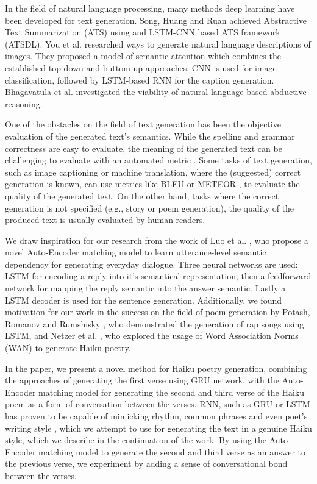 \documentclass{acm_proc_article-sp}
\begin{document}
In the field of natural language processing, many methods deep learning have been developed for text generation. Song, Huang and Ruan \cite{song2019abstractive} achieved Abstractive Text Summarization (ATS) using and LSTM-CNN based ATS framework (ATSDL). You et al. \cite{You_2016_CVPR} researched ways to generate natural language descriptions of images. They proposed a model of semantic attention which combines the established top-down and buttom-up approaches. CNN is used for image classification, followed by LSTM-based RNN for the caption generation. Bhagavatula et al. \cite{bhagavatula2020abductive} investigated the viability of natural language-based abductive reasoning.

One of the obstacles on the field of text generation has been the objective evaluation of the generated text's semantics. While the spelling and grammar correctness are easy to evaluate, the meaning of the generated text can be challenging to evaluate with an automated metric \cite{celikyilmaz2020evaluation}. Some tasks of text generation, such as image captioning or machine translation, where the (suggested) correct generation is known, can use metrics like BLEU \cite{papineni2002bleu} or METEOR \cite{banerjee2005meteor}, to evaluate the quality of the generated text. On the other hand, tasks where the correct generation is not specified (e.g., story \cite{pawade2018story} or poem \cite{zhang2014chinese} generation), the quality of the produced text is usually evaluated by human readers.

We draw inspiration for our research from the work of Luo et al. \cite{luo2018autoencoder}, who propose a novel Auto-Encoder matching model to learn utterance-level semantic dependency for generating everyday dialogue. Three neural networks are used: LSTM for encoding a reply into it's semantical representation, then a feedforward network for mapping the reply semantic into the answer semantic. Lastly a LSTM decoder is used for the sentence generation. Additionally, we found motivation for our work in the success on the field of poem generation by Potash, Romanov and Rumshisky \cite{potash2015ghostwriter}, who demonstrated the generation of rap songs using LSTM, and Netzer et al. \cite{netzer2009gaiku}, who explored the usage of Word Association Norms (WAN) to generate Haiku poetry.

In the paper, we present a novel method for Haiku poetry generation, combining the approaches of generating the first verse using GRU network, with the Auto-Encoder matching model \cite{luo2018autoencoder} for generating the second and third verse of the Haiku poem as a form of conversation between the verses. RNN, such as GRU or LSTM has proven to be capable of mimicking rhythm, common phrases and even poet's writing style \cite{potash2015ghostwriter}, which we attempt to use for generating the text in a genuine Haiku style, which we describe in the continuation of the work. By using the Auto-Encoder matching model to generate the second and third verse as an answer to the previous verse, we experiment by adding a sense of conversational bond between the verses.
\end{document}
